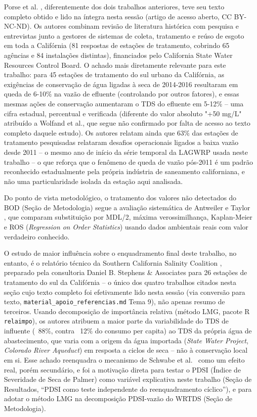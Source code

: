 Porse et al. \cite{porse2023adapting}, diferentemente dos dois trabalhos anteriores, teve seu texto completo obtido e lido na íntegra nesta sessão (artigo de acesso aberto, CC BY-NC-ND). Os autores combinam revisão de literatura histórica com pesquisa e entrevistas junto a gestores de sistemas de coleta, tratamento e reúso de esgoto em toda a Califórnia (81 respostas de estações de tratamento, cobrindo 65 agências e 84 instalações distintas), financiados pelo California State Water Resources Control Board. O achado mais diretamente relevante para este trabalho: para 45 estações de tratamento do sul urbano da Califórnia, as exigências de conservação de água ligadas à seca de 2014-2016 resultaram em queda de 6-10\% na vazão de efluente (controlando por outros fatores), e essas mesmas ações de conservação aumentaram o TDS do efluente em 5-12\% -- uma cifra estadual, percentual e verificada (diferente do valor absoluto "+50 mg/L" atribuído a Wolfand et al., que segue não confirmado por falta de acesso ao texto completo daquele estudo). Os autores relatam ainda que 63\% das estações de tratamento pesquisadas relataram desafios operacionais ligados a baixa vazão desde 2011 -- o mesmo ano de início da série temporal da LAGWRP usada neste trabalho -- o que reforça que o fenômeno de queda de vazão pós-2011 é um padrão reconhecido estadualmente pela própria indústria de saneamento californiana, e não uma particularidade isolada da estação aqui analisada.

Do ponto de vista metodológico, o tratamento dos valores não detectados do BOD (Seção de Metodologia) segue a avaliação sistemática de Antweiler e Taylor \cite{antweiler2008evaluation}, que comparam substituição por MDL/2, máxima verossimilhança, Kaplan-Meier e ROS (\textit{Regression on Order Statistics}) usando dados ambientais reais com valor verdadeiro conhecido.

O estudo de maior influência sobre o enquadramento final deste trabalho, no entanto, é o relatório técnico da Southern California Salinity Coalition \cite{scsc2018tds}, preparado pela consultoria Daniel B. Stephens \& Associates para 26 estações de tratamento do sul da Califórnia -- o único dos quatro trabalhos citados nesta seção cujo texto completo foi efetivamente lido nesta sessão (via conversão para texto, \texttt{material\_apoio\_referencias.md} Tema 9), não apenas resumo de terceiros. Usando decomposição de importância relativa (método LMG, pacote R \texttt{relaimpo}), os autores atribuem a maior parte da variabilidade do TDS de influente (~88\%, contra ~12\% do consumo per capita) ao TDS da própria água de abastecimento, que varia com a origem da água importada (\textit{State Water Project}, \textit{Colorado River Aqueduct}) em resposta a ciclos de seca -- não à conservação local em si. Esse achado reenquadra o mecanismo de Schwabe et al.\ \cite{schwabe2020unintended} como um efeito real, porém secundário, e foi a motivação direta para testar o PDSI (Índice de Severidade de Seca de Palmer) como variável explicativa neste trabalho (Seção de Resultados, ``PDSI como teste independente do reenquadramento cíclico''), e para adotar o método LMG na decomposição PDSI-vazão do WRTDS (Seção de Metodologia).
